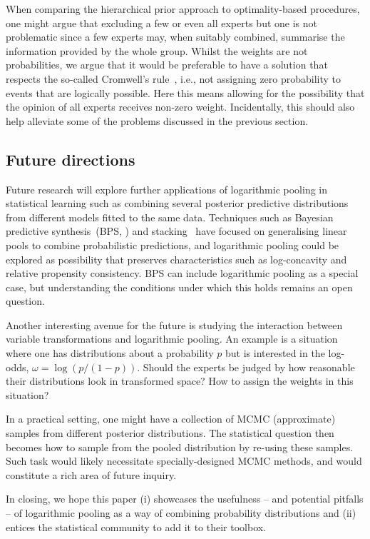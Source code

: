 \documentclass[12pt]{article}
\begin{document}
When comparing the hierarchical prior approach to optimality-based procedures, one might argue that excluding a few or even all experts but one is not problematic since a few experts may, when suitably combined, summarise the information provided by the whole group.
Whilst the weights are not probabilities, we argue that it would be preferable to have a solution that respects the so-called Cromwell's rule~\parencite[pg. 91]{Lindley2013}, i.e., not assigning zero probability to events that are logically possible.
Here this means allowing for the possibility that the opinion of all experts receives non-zero weight.
Incidentally, this should also help alleviate some of the problems discussed in the previous section.

\subsection{Future directions}

Future research will explore further applications of logarithmic pooling in statistical learning such as combining several posterior predictive distributions from different models fitted to the same data.
Techniques such as Bayesian predictive synthesis~(BPS, \textcite{McAlinn2018, McAlinn2019a,McAlinn2019b}) and stacking~\parencite{Yao2018} have focused on generalising linear pools to combine probabilistic predictions, and logarithmic pooling could be explored as possibility that preserves characteristics such as log-concavity and relative propensity consistency.
BPS can include logarithmic pooling as a special case, but understanding the conditions under which this holds remains an open question.

Another interesting avenue for the future is studying the interaction between variable transformations and logarithmic pooling.
An example is a situation where one has distributions about a probability $p$ but is interested in the log-odds, $\omega = \log(p/(1-p))$.
Should the experts be judged by how reasonable their distributions look in transformed space?
How to assign the weights in this situation?
 
In a practical setting, one might have a collection of MCMC (approximate) samples from different posterior distributions.
The statistical question then becomes how to sample from the pooled distribution by re-using these samples.
Such task would likely necessitate specially-designed MCMC methods, and would constitute a rich area of future inquiry.

In closing, we hope this paper (i) showcases the usefulness -- and potential pitfalls -- of logarithmic pooling as a way of combining probability distributions and (ii) entices the statistical community to add it to their toolbox.
\end{document}
